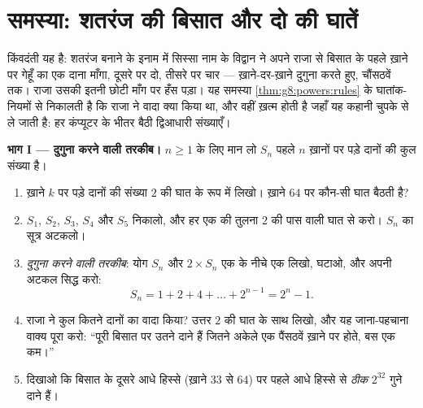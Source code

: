 \section{समस्या: शतरंज की बिसात और दो की घातें}

\begin{problem}[{सप्ताहांत समस्या --- गुणोत्तर योग
$1 + 2 + 4 + \dots + 2^{n-1} = 2^n - 1$, एक मशहूर किंवदंती से
द्विआधारी संख्याओं तक}]
\label{pb:g8:powers:1}
किंवदंती यह है: शतरंज बनाने के इनाम में सिस्सा नाम के विद्वान ने
अपने राजा से बिसात के पहले ख़ाने पर गेहूँ का एक दाना माँगा, दूसरे पर
दो, तीसरे पर चार --- ख़ाने-दर-ख़ाने दुगुना करते हुए, चौंसठवें तक।
राजा उसकी इतनी छोटी माँग पर हँस पड़ा। यह समस्या
\cref{thm:g8:powers:rules} के घातांक-नियमों से निकालती है कि राजा ने
वादा क्या किया था, और वहीं ख़त्म होती है जहाँ यह कहानी चुपके से ले
जाती है: हर कंप्यूटर के भीतर बैठी द्विआधारी संख्याएँ।

\medskip
\noindent\textbf{भाग I --- दुगुना करने वाली तरकीब।}
$n \geq 1$ के लिए मान लो $S_n$ पहले $n$ ख़ानों पर पड़े दानों की कुल
संख्या है।
\begin{enumerate}
  \item ख़ाने $k$ पर पड़े दानों की संख्या $2$ की घात के रूप में
        लिखो। ख़ाने $64$ पर कौन-सी घात बैठती है?
  \item $S_1$, $S_2$, $S_3$, $S_4$ और $S_5$ निकालो, और हर एक की
        तुलना $2$ की पास वाली घात से करो। $S_n$ का सूत्र अटकलो।
  \item \emph{दुगुना करने वाली तरकीब}: योग $S_n$ और
        $2 \times S_n$ एक के नीचे एक लिखो, घटाओ, और अपनी अटकल
        सिद्ध करो:
        \[
        S_n = 1 + 2 + 4 + \dots + 2^{n-1} = 2^n - 1 .
        \]
  \item राजा ने कुल कितने दानों का वादा किया? उत्तर $2$ की घात के
        साथ लिखो, और यह जाना-पहचाना वाक्य पूरा करो: ``पूरी बिसात पर
        उतने दाने हैं जितने अकेले एक पैंसठवें ख़ाने पर होते, बस एक
        कम।''
  \item दिखाओ कि बिसात के दूसरे आधे हिस्से (ख़ाने $33$ से $64$) पर
        पहले आधे हिस्से से \emph{ठीक} $2^{32}$ गुने दाने हैं।
\end{enumerate}


\end{problem}
